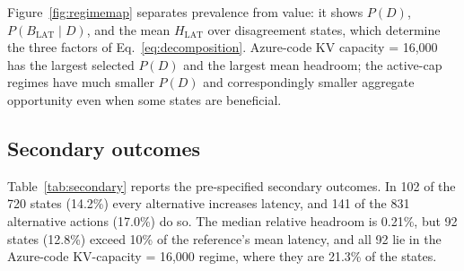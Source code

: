 \documentclass[preprint,12pt]{elsarticle}
\begin{document}
Figure~\ref{fig:regimemap} separates prevalence from value: it shows $P(D)$, $P(B_{\mathrm{LAT}}\mid D)$,
and the mean $H_{\mathrm{LAT}}$ over disagreement states, which determine the
three factors of Eq.~\ref{eq:decomposition}. Azure-code KV
capacity = 16,000 has the largest selected $P(D)$ and the largest mean headroom;
the active-cap regimes have much smaller $P(D)$ and correspondingly smaller
aggregate opportunity even when some states are beneficial.

\subsection{Secondary outcomes}
\label{sec:secondary}
Table~\ref{tab:secondary} reports the pre-specified secondary outcomes. In 102
of the 720 states (14.2\%) every alternative increases latency, and 141 of the
831 alternative actions (17.0\%) do so. The median relative headroom is 0.21\%,
but 92 states (12.8\%) exceed 10\% of the reference's mean latency, and all 92
lie in the Azure-code KV-capacity = 16,000 regime, where they are 21.3\% of the
states.
\end{document}
